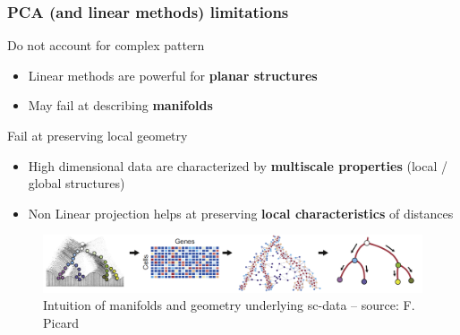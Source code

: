 \documentclass{beamer}\usepackage[]{graphicx}\usepackage[]{color}
\begin{document}
\begin{frame}
  \frametitle{PCA (and linear methods) limitations}

  \begin{block}{Do not account for complex pattern}
    \begin{itemize}
      \item Linear methods are powerful for \alert{\bf planar structures}
      \item May fail at describing \alert{\bf manifolds}
    \end{itemize}
  \end{block}
  
  \begin{block}{Fail at preserving local geometry}
    \begin{itemize}
      \item High dimensional data are characterized by \alert{\bf multiscale properties} (local / global structures)
      \item Non Linear projection helps at preserving \alert{\bf local characteristics} of distances
    \end{itemize}
  \end{block}

  \vfill
  
   \begin{figure}
     \includegraphics[scale=0.25]{figures/manifold.pdf}
     \caption{\small Intuition of manifolds and geometry underlying sc-data -- {\tiny source: F. Picard}}
   \end{figure}

\end{frame}

% 
%   
%   
%   
\end{document}
